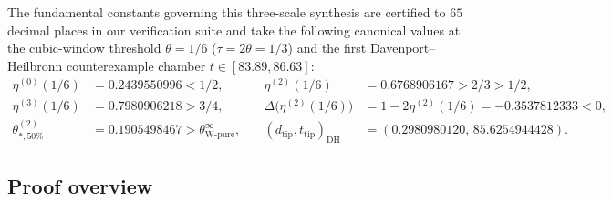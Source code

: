 \documentclass[11pt,reqno]{amsart}
\theoremstyle{definition}
\theoremstyle{remark}
\numberwithin{equation}{section}
\newcommand{\DHf}{\mathrm{DH}}
\begin{document}
The fundamental constants governing this three-scale synthesis are certified to $65$ decimal places in our verification suite and take the following canonical values at the cubic-window threshold $\theta = 1/6$ ($\tau = 2\theta = 1/3$) and the first Davenport--Heilbronn counterexample chamber $t \in [83.89, 86.63]$:
\begin{equation}\label{eq:canonical-constants}
\begin{aligned}
\eta^{(0)}(1/6) &= 0.2439550996 < 1/2, &\quad \eta^{(2)}(1/6) &= 0.6768906167 > 2/3 > 1/2, \\
\eta^{(3)}(1/6) &= 0.7980906218 > 3/4, &\quad \Delta\bigl(\eta^{(2)}(1/6)\bigr) &= 1 - 2\eta^{(2)}(1/6) = -0.3537812333 < 0, \\
\theta_{*,50\%}^{(2)} &= 0.1905498467 > \theta_{\mathrm{W\text{-}pure}}^\infty, &\quad (d_{\mathrm{tip}}, t_{\mathrm{tip}})_{\DHf} &= (0.2980980120,\, 85.6254944428).
\end{aligned}
\end{equation}

\subsection{Proof overview}\label{subsec:proof-overview}
\end{document}
